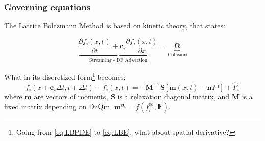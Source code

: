\documentclass{beamer}
\begin{document}
		
		\begin{frame}
			\frametitle{Governing equations}
			
			The Lattice Boltzmann Method is based on kinetic theory, that states:
			
			\begin{equation}\label{eq:LBPDE}
			\underbrace{\frac{\partial f_i(x,t)}{\partial t} + \mathbf{c}_i \frac{\partial f_i(x,t)}{\partial x}}_{\text{Streaming - DF Advection}} = \underbrace{\mathbf{\Omega}}_{\text{Collision}} 
			\end{equation}
			
			What in its discretized form\footnote{Going from \ref{eq:LBPDE} to \ref{eq:LBE}, what about spatial derivative?} becomes:
			\begin{equation}\label{eq:LBE}
				f_i(x+ \mathbf{c}_i \Delta t, t+\Delta t) - f_i(x, t) = - \mathbf{M}^{-1} \mathbf{S} [\mathbf{m}(x,t) - \mathbf{m}^{\text{eq}}]  + \hat{F}_i
			\end{equation}
			where $\mathbf{m}$ are vectors of moments, $\mathbf{S}$ is a relaxation diagonal matrix, and $\mathbf{M}$ is a fixed matrix depending on DnQm. $ \mathbf{m}^{\text{eq}} = f(f_i^{\text{eq}}, \mathbf{F})$.
		\end{frame}
		
\end{document}
